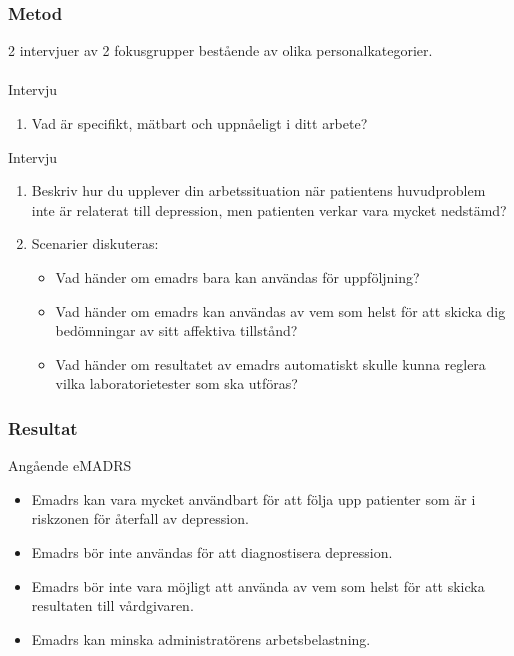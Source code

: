 \documentclass[english]{beamer}
\begin{document}
\begin{frame}
\frametitle{Metod}
2 intervjuer av 2 fokusgrupper bestående av olika personalkategorier.\\\ \\
Intervju {}\vspace{-.33em}
\begin{enumerate}
\item {\bf} Vad {\"a}r specifikt, m{\"a}tbart och uppn{\aa}eligt i ditt arbete?
\end{enumerate}
Intervju {}\vspace{-.33em}
\begin{enumerate}
\item {\bf} Beskriv hur du upplever din arbetssituation n{\"a}r patientens huvudproblem inte {\"a}r relaterat till depression, men patienten verkar vara mycket nedst{\"a}md?\vspace{-.33em}
\item {\bf} Scenarier diskuteras:\vspace{-.33em}
\begin{itemize}\vspace{-.33em}
\item {\bf} Vad h{\"a}nder om e{\sc madrs} bara kan anv{\"a}ndas f{\"or} uppf{\"o}ljning?\vspace{-.33em}
\item {\bf} Vad h{\"a}nder om e{\sc madrs} kan anv{\"a}ndas av vem som helst f{\"o}r att skicka dig bed{\"o}mningar av sitt affektiva tillst{\aa}nd?\vspace{-.33em}
\item {\bf} Vad h{\"a}nder om resultatet av e{\sc madrs} automatiskt skulle kunna reglera vilka laboratorietester som ska utf{\"o}ras?
\end{itemize}
\end{enumerate}
\end{frame}

\begin{frame}
\frametitle{Resultat}
Angående eMADRS
\begin{itemize}
\item Emadrs kan vara mycket användbart för att följa upp patienter som är i riskzonen för återfall av depression.
\item Emadrs bör inte användas för att diagnostisera depression.
\item Emadrs bör inte vara möjligt att använda av vem som helst för att skicka resultaten till vårdgivaren. 
\item Emadrs kan minska administratörens arbetsbelastning. 
\end{itemize}
\end{frame}
\end{document}
